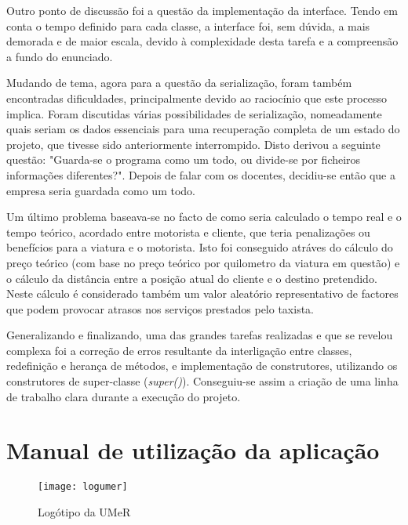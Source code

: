 \documentclass[a4paper]{article}
\begin{document}
\pagebreak
\par Outro ponto de discussão foi a questão da implementação da interface. Tendo em conta o tempo definido para cada classe, a interface foi, sem dúvida, a mais demorada e de maior escala, devido à  complexidade desta tarefa e a compreensão a fundo do enunciado.
\par Mudando de tema, agora para a questão da serialização, foram também encontradas dificuldades, principalmente devido ao raciocínio que este processo implica. Foram discutidas várias possibilidades de serialização, nomeadamente quais seriam os dados essenciais para uma recuperação completa de um estado do projeto, que tivesse sido anteriormente interrompido. Disto derivou a seguinte questão: "Guarda-se o programa como um todo, ou divide-se por ficheiros informações diferentes?". Depois de falar com os docentes, decidiu-se então que a empresa seria guardada como um todo.
\par Um último problema baseava-se no facto de como seria calculado o tempo real e o tempo teórico, acordado entre motorista e cliente, que teria penalizações ou benefícios para a viatura e o motorista. Isto foi conseguido atráves do cálculo do preço teórico (com base no preço teórico por quilometro da viatura em questão) e o cálculo da distância entre a posição atual do cliente e o destino pretendido. Neste cálculo é considerado também um valor aleatório representativo de factores que podem provocar atrasos nos serviços prestados pelo taxista.
\par Generalizando e finalizando, uma das grandes tarefas realizadas e que se revelou complexa foi a correção de erros resultante da interligação entre classes, redefinição e herança de métodos, e implementação de construtores, utilizando os construtores de super-classe (\emph{super()}). Conseguiu-se assim a criação de uma linha de trabalho clara durante a execução do projeto.

\pagebreak
\section{Manual de utilização da aplicação}
\label{sec:6}

\begin{wrapfigure}{l}{0.25\textwidth}
\texttt{[image: logumer]} 
\caption{Logótipo da UMeR}
\label{fig:logumer}
\end{wrapfigure}
\end{document}

